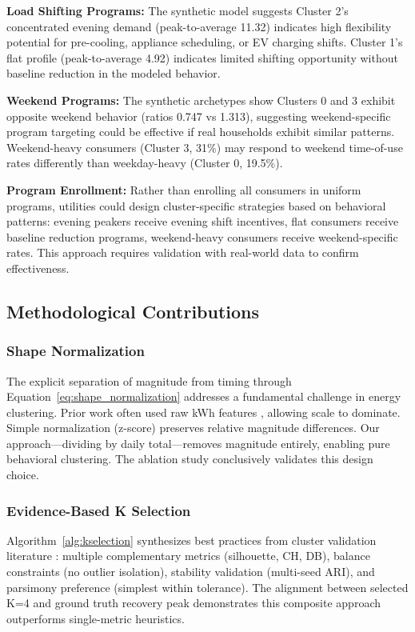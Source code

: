 \documentclass[11pt,a4paper]{article}
\begin{document}
\textbf{Load Shifting Programs:} The synthetic model suggests Cluster 2's concentrated evening demand (peak-to-average 11.32) indicates high flexibility potential for pre-cooling, appliance scheduling, or EV charging shifts. Cluster 1's flat profile (peak-to-average 4.92) indicates limited shifting opportunity without baseline reduction in the modeled behavior.

\textbf{Weekend Programs:} The synthetic archetypes show Clusters 0 and 3 exhibit opposite weekend behavior (ratios 0.747 vs 1.313), suggesting weekend-specific program targeting could be effective if real households exhibit similar patterns. Weekend-heavy consumers (Cluster 3, 31\%) may respond to weekend time-of-use rates differently than weekday-heavy (Cluster 0, 19.5\%).

\textbf{Program Enrollment:} Rather than enrolling all consumers in uniform programs, utilities could design cluster-specific strategies based on behavioral patterns: evening peakers receive evening shift incentives, flat consumers receive baseline reduction programs, weekend-heavy consumers receive weekend-specific rates. This approach requires validation with real-world data to confirm effectiveness.

\subsection{Methodological Contributions}

\subsubsection{Shape Normalization}

The explicit separation of magnitude from timing through Equation~\ref{eq:shape_normalization} addresses a fundamental challenge in energy clustering. Prior work often used raw kWh features \cite{kwac2014household,rhodes2014clustering}, allowing scale to dominate. Simple normalization (z-score) preserves relative magnitude differences. Our approach---dividing by daily total---removes magnitude entirely, enabling pure behavioral clustering. The ablation study conclusively validates this design choice.

\subsubsection{Evidence-Based K Selection}

Algorithm~\ref{alg:kselection} synthesizes best practices from cluster validation literature \cite{hennig2020comparing,gates2019adjusted}: multiple complementary metrics (silhouette, CH, DB), balance constraints (no outlier isolation), stability validation (multi-seed ARI), and parsimony preference (simplest within tolerance). The alignment between selected K=4 and ground truth recovery peak demonstrates this composite approach outperforms single-metric heuristics.
\end{document}
